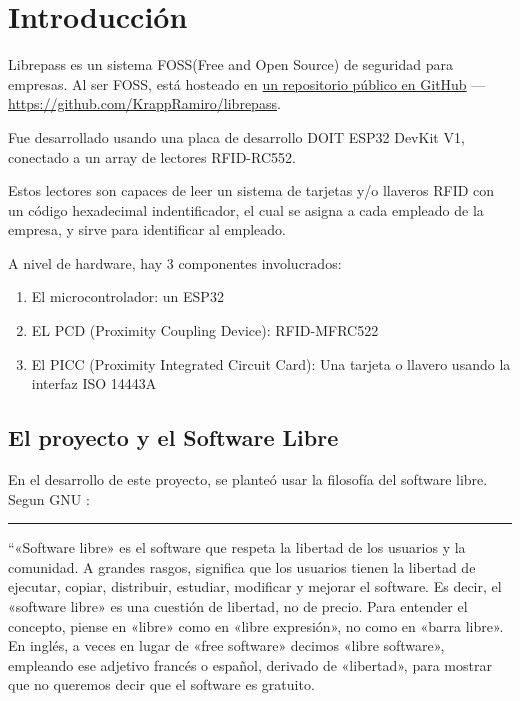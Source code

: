 \documentclass[../informe_krapp.tex]{subfiles}
\begin{document}
\graphicspath{{../images/}}
{
\renewcommand{\subsectionbreak}{}
\section{Introducción}

Librepass es un sistema FOSS(Free and Open Source) de seguridad para empresas.
Al ser FOSS, está hosteado en
\href{https://github.com/KrappRamiro/librepass}{un repositorio público en GitHub} ---
{\small \url{https://github.com/KrappRamiro/librepass}}.

Fue desarrollado usando una placa de desarrollo DOIT ESP32 DevKit V1, conectado
a un array de lectores RFID-RC552.

Estos lectores son capaces de leer un sistema de tarjetas y/o llaveros RFID con un
código hexadecimal indentificador, el cual se asigna a cada empleado de la empresa, y
sirve para identificar al empleado.

A nivel de hardware, hay 3 componentes involucrados:
\begin{enumerate}
	\item El microcontrolador: un ESP32
	\item EL PCD (Proximity Coupling Device): RFID-MFRC522
	\item El PICC (Proximity Integrated Circuit Card): Una tarjeta o llavero usando
	      la interfaz ISO 14443A
\end{enumerate}

\subsection{El proyecto y el Software Libre}
En el desarrollo de este proyecto, se planteó usar la filosofía del software libre.
Segun GNU \cite{gnu}:
\begin{center}
	\rule{0.8\textwidth}{0.3pt}
\end{center}
``«Software libre» es el software que respeta la libertad de los usuarios y la comunidad. A grandes rasgos, significa que los usuarios tienen la libertad de ejecutar, copiar, distribuir, estudiar, modificar y mejorar el software. Es decir, el «software libre» es una cuestión de libertad, no de precio. Para entender el concepto, piense en «libre» como en «libre expresión», no como en «barra libre». En inglés, a veces en lugar de «free software» decimos «libre software», empleando ese adjetivo francés o español, derivado de «libertad», para mostrar que no queremos decir que el software es gratuito.

}
\end{document}
